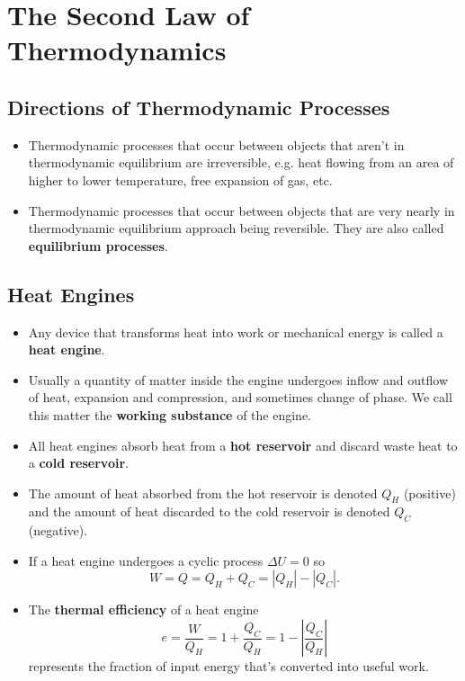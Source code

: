 \documentclass{article}
\begin{document}
\section{The Second Law of Thermodynamics}

\subsection{Directions of Thermodynamic Processes}

\begin{itemize}
  \item Thermodynamic processes that occur between objects that aren't in thermodynamic equilibrium are irreversible, e.g. heat flowing from an area of higher to lower temperature, free expansion of gas, etc.

  \item Thermodynamic processes that occur between objects that are very nearly in thermodynamic equilibrium approach being reversible. They are also called \textbf{equilibrium processes}.
\end{itemize}

\subsection{Heat Engines}

\begin{itemize}
  \item Any device that transforms heat into work or mechanical energy is called a \textbf{heat engine}.

  \item Usually a quantity of matter inside the engine undergoes inflow and outflow of heat, expansion and compression, and sometimes change of phase. We call this matter the \textbf{working substance} of the engine.

  \item All heat engines absorb heat from a \textbf{hot reservoir} and discard waste heat to a \textbf{cold reservoir}.

  \item The amount of heat absorbed from the hot reservoir is denoted $Q_H$ (positive) and the amount of heat discarded to the cold reservoir is denoted $Q_C$ (negative).

  \item If a heat engine undergoes a cyclic process $\Delta U = 0$ so \[W = Q = Q_H + Q_C = |Q_H| - |Q_C|.\]

  \item The \textbf{thermal efficiency} of a heat engine \[e = \frac{W}{Q_H} = 1 + \frac{Q_C}{Q_H} = 1 - \left| \frac{Q_C}{Q_H} \right|\] represents the fraction of input energy that's converted into useful work.
\end{itemize}
\end{document}

